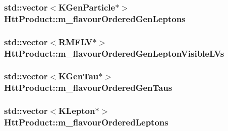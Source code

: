 \label{classHttProduct_af4194179accc2aaaf06f6cd734c0622b}
\hypertarget{classHttProduct_a18eca3b916d8a8824d92200c957e7ac9}{
\subsubsection[{m\_\-flavourOrderedGenLeptons}]{\setlength{\rightskip}{0pt plus 5cm}std::vector$<$KGenParticle$\ast$$>$ {\bf HttProduct::m\_\-flavourOrderedGenLeptons}}}
\label{classHttProduct_a18eca3b916d8a8824d92200c957e7ac9}
\hypertarget{classHttProduct_a8ba976173e7b164b171a5cb19fce4d77}{
\subsubsection[{m\_\-flavourOrderedGenLeptonVisibleLVs}]{\setlength{\rightskip}{0pt plus 5cm}std::vector$<$RMFLV$\ast$$>$ {\bf HttProduct::m\_\-flavourOrderedGenLeptonVisibleLVs}}}
\label{classHttProduct_a8ba976173e7b164b171a5cb19fce4d77}
\hypertarget{classHttProduct_af3a22fec33a3dc27d44b9124c8d1efca}{
\subsubsection[{m\_\-flavourOrderedGenTaus}]{\setlength{\rightskip}{0pt plus 5cm}std::vector$<$KGenTau$\ast$$>$ {\bf HttProduct::m\_\-flavourOrderedGenTaus}}}
\label{classHttProduct_af3a22fec33a3dc27d44b9124c8d1efca}
\hypertarget{classHttProduct_af914b7dae638ccd70a9f3fd33a39ebb1}{
\subsubsection[{m\_\-flavourOrderedLeptons}]{\setlength{\rightskip}{0pt plus 5cm}std::vector$<$KLepton$\ast$$>$ {\bf HttProduct::m\_\-flavourOrderedLeptons}}}
\label{classHttProduct_af914b7dae638ccd70a9f3fd33a39ebb1}
